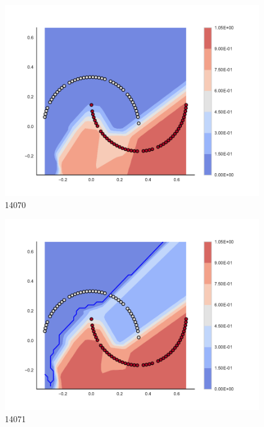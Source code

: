 \begin{subfigure}[b]{0.09\textwidth}
    \includegraphics[clip, trim=2.35cm 1.75cm 4.5cm 0cm,width=\textwidth]{img/convergence/14070.pdf}
    \caption{14070}
    \label{fig:convergence_14070}
\end{subfigure}
%
\begin{subfigure}[b]{0.09\textwidth}
    \includegraphics[clip, trim=2.35cm 1.75cm 4.5cm 0cm,width=\textwidth]{img/convergence/14071.pdf}
    \caption{14071}
    \label{fig:convergence_14071}
\end{subfigure}
%

